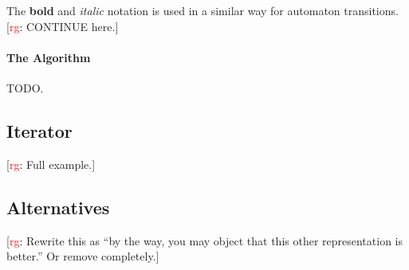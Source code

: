\documentclass[a4paper]{article}
\newcommand{\todo}[2]{{\small [\textcolor{red}{#1}: #2]}}
\newcommand{\rg}[1]{\todo{rg}{#1}}
\theoremstyle{slanted}
\theoremstyle{definition}
\theoremstyle{remark}
\begin{document}
The \textbf{bold} and \textit{italic} notation is used in a similar way for automaton transitions.
\rg{CONTINUE here.}

\paragraph{The Algorithm}
TODO.


\subsection{Iterator}\label{sec:iterator} %

\rg{Full example.}

\subsection{Alternatives} %

\rg{Rewrite this as ``by the way, you may object that this other representation
is better.'' Or remove completely.}
\end{document}
